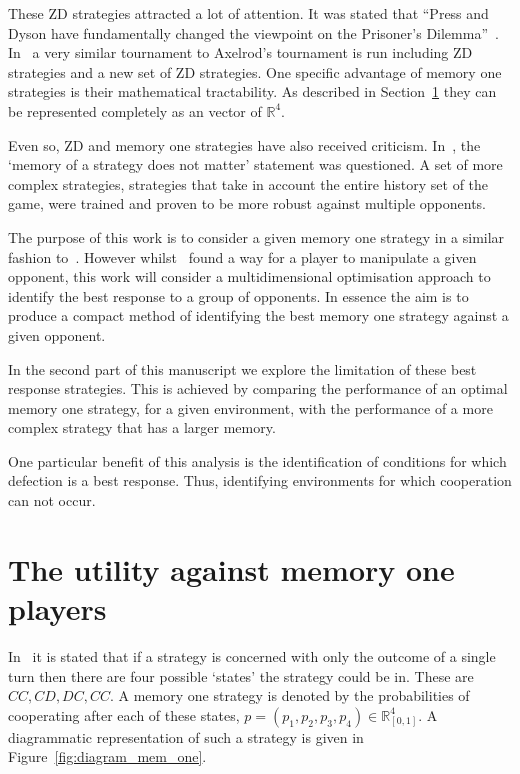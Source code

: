 \documentclass[10pt]{article}
\newcommand{\R}{\mathbb{R}}
\begin{document}
These ZD strategies attracted a lot of attention. It was stated that ``Press and
Dyson have fundamentally changed the viewpoint on the Prisoner's
Dilemma''~\cite{Stewart2012}. In~\cite{Stewart2012} a very similar tournament to
Axelrod's tournament is run including ZD strategies and a new set of ZD
strategies. One specific advantage of memory one strategies is
their mathematical tractability.  As described in
Section~\ref{section:utility_against_mem_one} they can be represented completely
as an vector of \(\R^{4}\).

Even so, ZD and memory one strategies have also received criticism.
In~\cite{Harper2015},
the `memory of a strategy does not matter' statement was questioned. A set of more
complex strategies, strategies that take in account the entire history set of the
game, were trained and proven to be more robust against multiple opponents.

The purpose of this work is to consider a given memory one strategy in a similar
fashion to~\cite{Press2012}. However whilst~\cite{Press2012} found a way for a
player to manipulate a given opponent, this work will consider a
multidimensional optimisation approach to identify the best response to a group
of opponents. In essence the aim is to produce a compact method of identifying
the best memory one strategy against a given opponent.

In the second part of this manuscript we explore the limitation of these best
response strategies. This is achieved by comparing the performance of an optimal
memory one strategy, for a given environment, with the performance of a more
complex strategy that has a larger memory.

One particular benefit of this analysis is the identification of conditions for
which defection is a best response. Thus, identifying environments for which
cooperation can not occur.

\section{The utility against memory one players}\label{section:utility_against_mem_one}

In~\cite{Press2012} it
is stated that if a strategy is concerned with only the outcome of a single turn
then there are four possible `states' the strategy could be in. These are
\(CC, CD, DC,CC\). A memory one strategy is denoted by the probabilities of
cooperating after each of these states,
\(p=(p_1, p_2, p_3, p_4) \in \R_{[0,1]} ^ 4\).
A diagrammatic representation of such a strategy is given in
Figure~\ref{fig:diagram_mem_one}.
\end{document}
